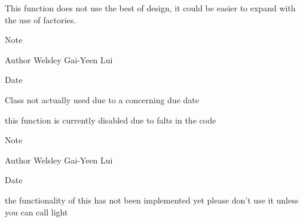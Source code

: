 
\begin{DoxyRefList}
\item[\label{bug__bug000001}%
\hypertarget{bug__bug000001}{}%
Class \hyperlink{class_asset_mng}{Asset\-Mng} ]This function does not use the best of design, it could be easier to expand with the use of factories.  
\item[\label{bug__bug000002}%
\hypertarget{bug__bug000002}{}%
Class \hyperlink{class_camera}{Camera} ]\begin{DoxyNote}{Note}

\end{DoxyNote}
\begin{DoxyAuthor}{Author}
Welsley Gai-\/\-Yeen Lui 
\end{DoxyAuthor}
\begin{DoxyDate}{Date}

\end{DoxyDate}

\item[\label{bug__bug000003}%
\hypertarget{bug__bug000003}{}%
Class \hyperlink{class_loaderab}{Loaderab} ]Class not actually used due to a concerning due date  
\item[\label{bug__bug000004}%
\hypertarget{bug__bug000004}{}%
Member \hyperlink{class_render_a05951fdb27e9ad1fbc28be2c682aaf12}{Render\-:\-:set\-Colour} (float R, float G, float B)]this function is currently disabled due to falts in the code  
\item[\label{bug__bug000005}%
\hypertarget{bug__bug000005}{}%
Class \hyperlink{struct_vector3}{Vector3} ]\begin{DoxyNote}{Note}

\end{DoxyNote}
\begin{DoxyAuthor}{Author}
Welsley Gai-\/\-Yeen Lui 
\end{DoxyAuthor}
\begin{DoxyDate}{Date}

\end{DoxyDate}

\item[\label{bug__bug000006}%
\hypertarget{bug__bug000006}{}%
Member \hyperlink{class_window_a0d3072ad7bb6198c4a8f8b2eee9cb65a}{Window\-:\-:enable\-Lighting} ()]the functionality of this has not been implemented yet please don't use it unless you can call light 
\end{DoxyRefList}